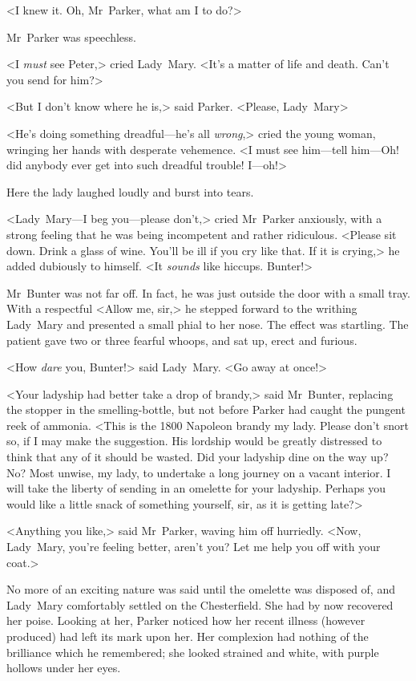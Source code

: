 <I knew it. Oh, Mr~Parker, what am I to do?>

Mr~Parker was speechless.

<I \emph{must} see Peter,> cried Lady~Mary. <It's a matter of life and death. Can't you send for him?>

<But I don't know where he is,> said Parker. <Please, Lady~Mary\longdash>

<He's doing something dreadful—he's all \emph{wrong},> cried the young woman, wringing her hands with desperate vehemence. <I must see him—tell him—Oh! did anybody ever get into such dreadful trouble! I—oh!\longdash>

Here the lady laughed loudly and burst into tears.

<Lady~Mary—I beg you—please don't,> cried Mr~Parker anxiously, with a strong feeling that he was being incompetent and rather ridiculous.  <Please sit down. Drink a glass of wine. You'll be ill if you cry like that. If it is crying,> he added dubiously to himself. <It \emph{sounds} like hiccups. Bunter!>

Mr~Bunter was not far off. In fact, he was just outside the door with a small tray. With a respectful <Allow me, sir,> he stepped forward to the writhing Lady~Mary and presented a small phial to her nose. The effect was startling. The patient gave two or three fearful whoops, and sat up, erect and furious.

<How \emph{dare} you, Bunter!> said Lady~Mary. <Go away at once!>

<Your ladyship had better take a drop of brandy,> said Mr~Bunter, replacing the stopper in the smelling-bottle, but not before Parker had caught the pungent reek of ammonia. <This is the 1800 Napoleon brandy my lady. Please don't snort so, if I may make the suggestion.  His lordship would be greatly distressed to think that any of it should be wasted. Did your ladyship dine on the way up? No? Most unwise, my lady, to undertake a long journey on a vacant interior. I will take the liberty of sending in an omelette for your ladyship. Perhaps you would like a little snack of something yourself, sir, as it is getting late?>

<Anything you like,> said Mr~Parker, waving him off hurriedly. <Now, Lady~Mary, you're feeling better, aren't you? Let me help you off with your coat.>

No more of an exciting nature was said until the omelette was disposed of, and Lady~Mary comfortably settled on the Chesterfield. She had by now recovered her poise. Looking at her, Parker noticed how her recent illness (however produced) had left its mark upon her. Her complexion had nothing of the brilliance which he remembered; she looked strained and white, with purple hollows under her eyes.

